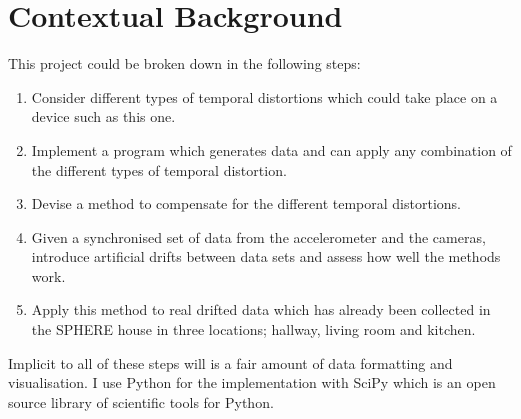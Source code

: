 \chapter{Contextual Background}
\label{chap:context}
%
%
%
%
%

This project could be broken down in the following steps:
\begin{enumerate}
    \item Consider different types of temporal distortions which could take place
        on a device such as this one.
    \item Implement a program which generates data and can apply any combination
        of the different types of temporal distortion.
    \item Devise a method to compensate for the different temporal distortions.
    \item Given a synchronised set of data from the accelerometer and the
        cameras, introduce artificial drifts between data sets and assess how well
        the methods work.
    \item Apply this method to real drifted data which has already been
        collected in the SPHERE house in three locations; hallway, living room and kitchen.
\end{enumerate}

Implicit to all of these steps will is a fair amount of data formatting and
visualisation. I use Python for the implementation with SciPy which
is an open source library of scientific tools for Python.
